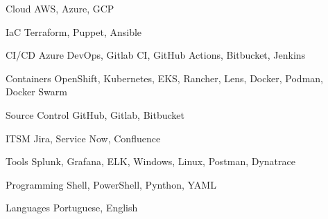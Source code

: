 

\begin{cvskills}

  \cvskill
    {Cloud} %
    {AWS, Azure, GCP} %

  \cvskill
    {IaC} %
    {Terraform, Puppet, Ansible} %

  \cvskill
    {CI/CD} %
    {Azure DevOps, Gitlab CI, GitHub Actions, Bitbucket, Jenkins} %

  \cvskill
    {Containers} %
    {OpenShift, Kubernetes, EKS, Rancher, Lens, Docker, Podman, Docker Swarm} %

  \cvskill
    {Source Control} %
    {GitHub, Gitlab, Bitbucket} %

  \cvskill
    {ITSM} %
    {Jira, Service Now, Confluence} %

  \cvskill
    {Tools} %
    {Splunk, Grafana, ELK, Windows, Linux, Postman, Dynatrace} %

  \cvskill
    {Programming} %
    {Shell, PowerShell, Pynthon, YAML} %

  \cvskill
    {Languages} %
    {Portuguese, English} %

\end{cvskills}